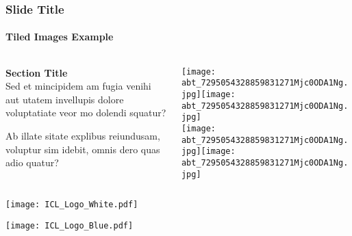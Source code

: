 \documentclass[
aspectratio=169, %
t, %
onlytextwidth, %
10pt, %
]{beamer}
\begin{document}

\begin{frame}
    \frametitle{Slide Title}
    \framesubtitle{Tiled Images Example}

    \small %

    \begin{columns}[T] %
        \begin{column}{0.3\linewidth} %
            \textbf{Section Title}\\
            Sed et mincipidem am fugia venihi aut utatem invellupis dolore voluptatiate veor mo dolendi squatur?

            Ab illate sitate explibus reiundusam, voluptur sim idebit, omnis dero quas adio quatur?
        \end{column}
        \begin{column}{0.68\linewidth} %
            \vspace{-3.5\baselineskip} %

            \texttt{[image: abt\_7295054328859831271Mjc0ODA1Ng.jpg]}\hfill\texttt{[image: abt\_7295054328859831271Mjc0ODA1Ng.jpg]}\\[4pt]
            \texttt{[image: abt\_7295054328859831271Mjc0ODA1Ng.jpg]}\hfill\texttt{[image: abt\_7295054328859831271Mjc0ODA1Ng.jpg]}\par
        \end{column}
    \end{columns}
\end{frame}


\begingroup
{} %

\begin{frame}[plain] %
    \medskip %
    \centering %
    \texttt{[image: ICL\_Logo\_White.pdf]}
\end{frame}
\endgroup


\begin{frame}[plain] %
    \medskip %
    \centering %
    \texttt{[image: ICL\_Logo\_Blue.pdf]}
\end{frame}
\end{document}
